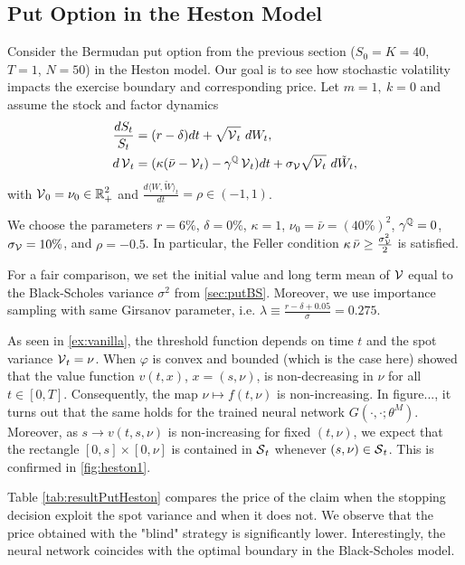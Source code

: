 \subsection{Put Option in the Heston Model}\label{sec:putHeston}

Consider the Bermudan put option from the previous section ($S_0 =K=40$, $T=1$, $N=50$) in the Heston model. Our goal is to see how stochastic volatility impacts the exercise boundary and  corresponding  price.   
 Let $m=1, \ k=0$ and assume the stock and factor dynamics
\begin{align*}
   \frac{dS_t}{S_t} &= (r-\delta)dt + \sqrt{\operatorname{\mathcal{V}}_t}\  dW_t, \\
   d\operatorname{\mathcal{V}}_t &= (\kappa(\bar{\nu}-\operatorname{\mathcal{V}}_t) - \gamma^{\operatorname{\mathbb{Q}}}\operatorname{\mathcal{V}}_t)dt + \sigma_{\operatorname{\mathcal{V}}} \sqrt{\operatorname{\mathcal{V}}_t}\  d\tilde{W}_t, 
\end{align*}
with $\operatorname{\mathcal{V}}_0 = \nu_0 \in \operatorname{\mathbb{R}}^2_+$ and $\frac{d\langle W, \tilde{W} \rangle_t}{dt} = \rho  \in  (-1,1)$. 
 
We choose the parameters
 $r = 6\%$, $\delta = 0\%$, $\kappa = 1$, $\nu_0 = \bar{\nu} = (40\%)^2$, $\gamma^{\operatorname{\mathbb{Q}}} =0$, $\sigma_{\operatorname{\mathcal{V}}} =10\%$, and $\rho =-0.5$. In particular, 
the Feller condition $\kappa \,  \bar{\nu} \ge  \frac{\sigma_{\operatorname{\mathcal{V}}}^2}{2}$ is satisfied.  

For a fair comparison,  we set the initial value and long term mean of $\operatorname{\mathcal{V}}$ equal to the Black-Scholes variance $\sigma^2$ from \cref{sec:putBS}.   Moreover, we use importance sampling with same Girsanov parameter, i.e. $\lambda \equiv \frac{r-\delta + 0.05}{\sigma}  = 0.275$.

As seen in \cref{ex:vanilla}, the threshold function 
depends on time $t$ and the spot variance $\operatorname{\mathcal{V}}_t =\nu$.  
When $\varphi$ is convex and bounded (which is the case here)   \citet{LambertonHeston} showed that the value function $v(t,x)$, $x=(s,\nu)$, is  non-decreasing in $\nu$ for all $t\in [0,T]$. Consequently, the map $\nu \mapsto f(t,\nu)$ is non-increasing. In figure..., it turns out that the same holds for the trained neural network $G(\cdot,\cdot;\theta^M)$. 
Moreover, as $s \to v(t,s,\nu)$ is non-increasing for fixed $(t,\nu)$,  we expect that the  rectangle $[0,s]\times [0,\nu]$ 
is contained in $\operatorname{\mathcal{S}}_t$ whenever $(s,\nu) \in \operatorname{\mathcal{S}}_t$. This is confirmed in  \cref{fig:heston1}. 

Table \cref{tab:resultPutHeston} compares the price of the claim when the stopping decision exploit the spot variance and when it does not. We observe that the price obtained with the "blind" strategy is significantly lower. Interestingly, the neural network coincides with the optimal boundary in the Black-Scholes model.%

